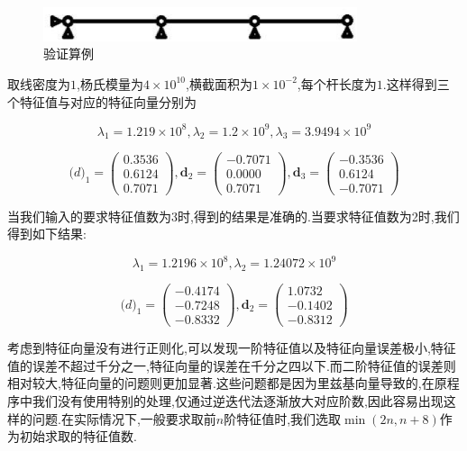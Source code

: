 \begin{figure}[htbp]
  \centering
  \includegraphics[height=1cm]{modalex}
  \caption{验证算例}
\end{figure}

取线密度为$1$,杨氏模量为$4\times 10^{10}$,横截面积为$1\times 10^{-2}$,每个杆长度为$1$.这样得到三个特征值与对应的特征向量分别为

\[
\lambda_1=1.219\times10^8,\lambda_2=1.2\times10^9,\lambda_3=3.9494\times10^9 \]

\[
\mathbf(d)_1=\left( \begin{array}{c} 0.3536 \\ 0.6124 \\ 0.7071 \end{array} \right),
\mathbf{d}_2=\left( \begin{array}{c} -0.7071 \\ 0.0000 \\ 0.7071 \end{array} \right),
\mathbf{d}_3=\left( \begin{array}{c} -0.3536 \\ 0.6124 \\ -0.7071 \end{array} \right) \]

当我们输入的要求特征值数为3时,得到的结果是准确的.当要求特征值数为2时,我们得到如下结果:

\[
\lambda_1=1.2196\times10^8,\lambda_2=1.24072\times10^9 \]

\[
\mathbf(d)_1=\left( \begin{array}{c} -0.4174 \\ -0.7248 \\ -0.8332 \end{array} \right),
\mathbf{d}_2=\left( \begin{array}{c} 1.0732 \\ -0.1402 \\ -0.8312 \end{array} \right) \]

考虑到特征向量没有进行正则化,可以发现一阶特征值以及特征向量误差极小,特征值的误差不超过千分之一,特征向量的误差在千分之四以下.而二阶特征值的误差则相对较大,特征向量的问题则更加显著.这些问题都是因为里兹基向量导致的,在原程序中我们没有使用特别的处理,仅通过逆迭代法逐渐放大对应阶数,因此容易出现这样的问题.在实际情况下,一般要求取前$n$阶特征值时,我们选取$\min (2n,n+8)$作为初始求取的特征值数.

